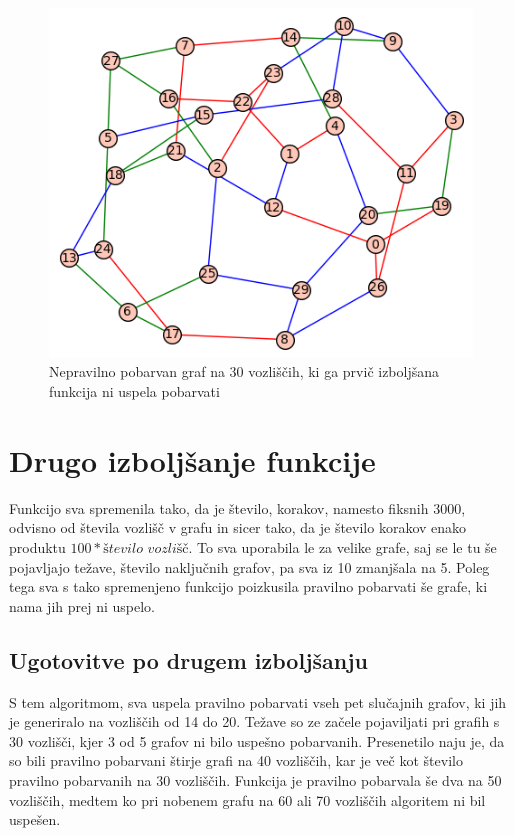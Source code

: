 \documentclass[12pt, a4paper]{article}
\begin{document}
\begin{figure}[H]
  \includegraphics[width=\linewidth]{30neuspel_pobarvan.png}
  \caption{Nepravilno pobarvan graf na 30 vozliščih, ki ga prvič izboljšana funkcija ni uspela pobarvati}
  \label{fig:30neuspel}
\end{figure}


\section{Drugo izboljšanje funkcije}

Funkcijo sva spremenila tako, da je število, korakov, namesto fiksnih 3000, odvisno od števila vozlišč v grafu in sicer tako, da je število korakov enako produktu $100 * število$ $vozlišč$. To sva uporabila le za velike grafe, saj se le tu še pojavljajo težave, število naključnih grafov, pa sva iz 10 zmanjšala na 5. Poleg tega sva s tako spremenjeno funkcijo poizkusila pravilno pobarvati še grafe, ki nama jih prej ni uspelo.

\subsection{Ugotovitve po drugem izboljšanju}

S tem algoritmom, sva uspela pravilno pobarvati vseh pet slučajnih grafov, ki jih je generiralo na vozliščih od 14 do 20. Težave so ze začele pojaviljati pri grafih s 30 vozlišči, kjer 3 od 5 grafov ni bilo uspešno pobarvanih. Presenetilo naju je, da so bili pravilno pobarvani štirje grafi na 40 vozliščih, kar je več kot število pravilno pobarvanih na 30 vozliščih. Funkcija je pravilno pobarvala še dva na 50 vozliščih, medtem ko pri nobenem grafu na 60 ali 70 vozliščih algoritem ni bil uspešen.
\end{document}
